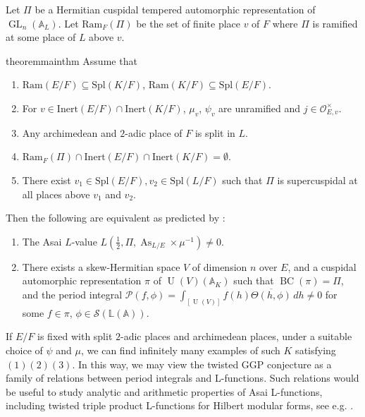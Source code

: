 \documentclass[11pt, reqno]{amsart}
\numberwithin{equation}{subsection}
\theoremstyle{plain}
\theoremstyle{definition}
\renewcommand{\AA}{\mathbb A}
\newcommand{\LL}{\mathbb L}
\renewcommand{\O}{\mathcal O}
\newcommand{\ol}{\overline}
\renewcommand{\P}{\mathcal P}
\newcommand{\cS}{\mathcal S}
\DeclareMathOperator{\GL}{GL}
\DeclareMathOperator{\U}{U}
\begin{document}
Let $\Pi$ be a Hermitian cuspidal tempered automorphic representation of $\GL_n(\AA_L)$. Let $\mathrm{Ram}_F(\Pi)$ be the set of finite place $v$ of $F$ where $\Pi$ is ramified at some place of $L$ above $v$. 

\begin{restatable}{theorem}{mainthm}
\label{thm:mainthm} 
Assume that
\begin{enumerate}
    \item \label{item:fieldsunr}
   $\mathrm{Ram}(E/F) \subseteq \mathrm{Spl}(K/F)$, $\mathrm{Ram}(K/F) \subseteq \mathrm{Spl}(E/F)$.
    \item \label{item:charsunr}
    For $v \in \mathrm{Inert}(E/F) \cap \mathrm{Inert}(K/F)$, $\mu_v$, $\psi_{v}$ are unramified 
    and $j \in \O_{E,v}^\times$.
    \item Any archimedean and $2$-adic place of $F$ is split in $L$.
    \item \label{item:piunr}
   $\mathrm{Ram}_F(\Pi) \cap \mathrm{Inert}(E/F) \cap \mathrm{Inert}(K/F) = \emptyset$.
    \item There exist $v_1 \in \mathrm{Spl}(E/F), v_2 \in \mathrm{Spl}(L/F)$ such that $\Pi$ is supercuspidal at all places above $v_1$ and $v_2$.
\end{enumerate}
Then the following are equivalent as predicted by \cite{TwistedGGP}:
\begin{enumerate}
    \item The Asai $L$-value $L(\frac 12,\Pi,\operatorname{As}_{L/E} \times \mu^{-1}) \ne 0$.
    
    \item There exists a skew-Hermitian space $V$ of
    dimension $n$ over $E$, and a cuspidal automorphic 
    representation $\pi$ of $\U(V)(\AA_K)$ such that $\operatorname{BC}(\pi) = \Pi$, and the period
    integral  $\P(f,\phi) = \int_{[\U(V)]}
         f(h)\ol{\Theta(h,\phi)}\, dh\ne 0$
for some $f \in \pi$, $\phi \in \cS(\LL(\AA))$.
\end{enumerate}
\end{restatable}

If $E/F$ is fixed with split $2$-adic places and archimedean places, under a suitable choice of $\psi$ and $\mu$, we can find infinitely many examples of such $K$ satisfying $(1)(2)(3)$. In this way, we may view the twisted GGP conjecture as a family of relations between period integrals and L-functions. Such relations \cite{TwistedGGP} would be useful to study analytic and arithmetic properties of Asai L-functions, including twisted triple product L-functions for Hilbert modular forms, see e.g. \cite{liu2016hirzebruch,grossi2024asai}. 
\end{document}

